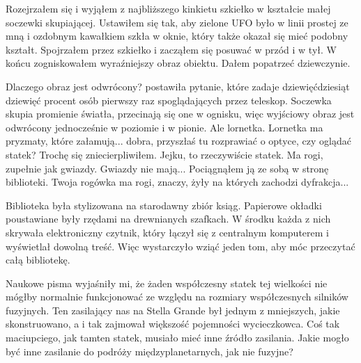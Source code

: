 Rozejrzałem się i wyjąłem z najbliższego kinkietu szkiełko w kształcie małej soczewki skupiającej.
Ustawiłem się tak, aby zielone UFO było w linii prostej ze mną i ozdobnym kawałkiem szkła w oknie, który także okazał się mieć podobny kształt.
Spojrzałem przez szkiełko i zacząłem się posuwać w przód i w tył. W końcu zogniskowałem wyraźniejszy obraz obiektu.
Dałem popatrzeć dziewczynie.

\begin{dialogue}
	\ds{} Dlaczego obraz jest odwrócony? \dm{} postawiła pytanie, które zadaje dziewięćdziesiąt dziewięć procent osób pierwszy raz spoglądających przez teleskop.
	\ds{} Soczewka skupia promienie światła, przecinają się one w ognisku, więc wyjściowy obraz jest odwrócony jednocześnie w poziomie i w pionie.
	\ds{} Ale lornetka.
	\ds{} Lornetka ma pryzmaty, które załamują... dobra, przyszłaś tu rozprawiać o optyce, czy oglądać statek? \dm{} Trochę się zniecierpliwiłem.
	\ds{} Jejku, to rzeczywiście statek. Ma rogi, zupełnie jak gwiazdy.
	\ds{} Gwiazdy nie mają... \dm{} Pociągnąłem ją ze sobą w stronę biblioteki. \dm{} Twoja rogówka ma rogi, znaczy, żyły na których zachodzi dyfrakcja...
\end{dialogue}

Biblioteka była stylizowana na starodawny zbiór ksiąg.
Papierowe okładki poustawiane były rzędami na drewnianych szafkach.
W środku każda z nich skrywała elektroniczny czytnik, który łączył się z centralnym komputerem i wyświetlał dowolną treść.
Więc wystarczyło wziąć jeden tom, aby móc przeczytać całą bibliotekę.

Naukowe pisma wyjaśniły mi, że żaden współczesny statek tej wielkości nie mógłby normalnie funkcjonować ze względu na rozmiary współczesnych silników fuzyjnych.
Ten zasilający nas na Stella Grande był jednym z mniejszych, jakie skonstruowano, a i tak zajmował większość pojemności wycieczkowca.
Coś tak maciupciego, jak tamten statek, musiało mieć inne źródło zasilania.
Jakie mogło być inne zasilanie do podróży międzyplanetarnych, jak nie fuzyjne?

